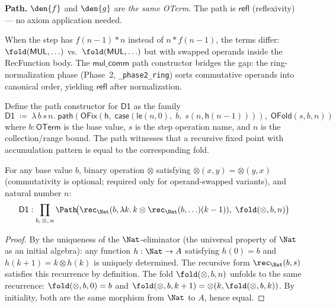\textbf{Path.}
$\den{f}$ and $\den{g}$ are \emph{the same OTerm}.  The path is
$\mathsf{refl}$ (reflexivity) --- no axiom application needed.

When the step has $f(n-1) * n$ instead of $n * f(n-1)$, the terms
differ: $\fold(\mathsf{MUL}, \ldots)$ vs.\ $\fold(\mathsf{MUL},
\ldots)$ but with swapped operands inside the RecFunction body.
The $\mathsf{mul\_comm}$ path constructor bridges the gap:
the ring-normalization phase (Phase~2, \texttt{\_phase2\_ring})
sorts commutative operands into canonical order, yielding
$\mathsf{refl}$ after normalization.

\begin{definition}
\label{def:d1-path}
Define the path constructor for $\mathsf{D1}$ as the family
\[
  \mathsf{D1} \;\coloneqq\; \lambda\, b\, s\, n.\;
  \mathsf{path}(\mathsf{OFix}(\mathsf{h},\;
    \mathsf{case}(\mathsf{le}(n, 0),\; b,\; s(n, \mathsf{h}(n-1)))),\;
  \mathsf{OFold}(s, b, n))
\]
where $b : \mathsf{OTerm}$ is the base value, $s$ is the step
operation name, and $n$ is the collection/range bound.  The path
witnesses that a recursive fixed point with accumulation pattern
is equal to the corresponding fold.
\end{definition}

\begin{theorem}[D1 Soundness]
\label{thm:d1-sound}
For any base value $b$, binary operation $\otimes$ satisfying
$\otimes(x, y) = \otimes(y, x)$ (commutativity is optional;
required only for operand-swapped variants), and natural number $n$:
\[
  \mathsf{D1} : \prod_{b,\, \otimes,\, n}
  \Path\!\big(\rec_\Nat(b, \lambda k.\, k \otimes \rec_\Nat(b, \ldots)(k-1)),\;
  \fold(\otimes, b, n)\big)
\]
\end{theorem}

\begin{proof}
By the uniqueness of the $\Nat$-eliminator (the universal property of
$\Nat$ as an initial algebra):  any function $h : \Nat \to A$ satisfying
$h(0) = b$ and $h(k+1) = k \otimes h(k)$ is uniquely determined.
The recursive form $\rec_\Nat(b, s)$ satisfies this recurrence by
definition.  The fold $\fold(\otimes, b, n)$ unfolds to the same
recurrence: $\fold(\otimes, b, 0) = b$ and $\fold(\otimes, b, k+1)
= \otimes(k, \fold(\otimes, b, k))$.  By initiality, both are the
same morphism from $\Nat$ to $A$, hence equal.
\end{proof}

